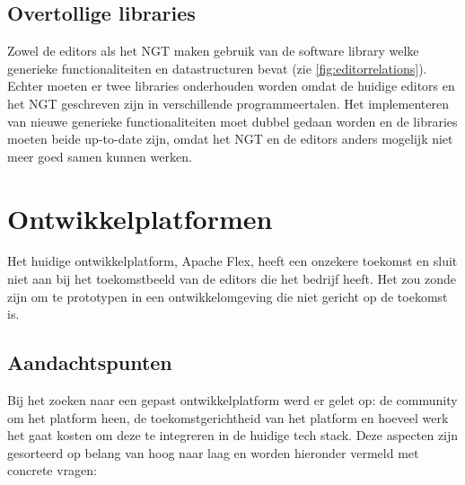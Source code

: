 \subsection{Overtollige libraries}
Zowel de editors als het NGT maken gebruik van de \organisation{} software library welke generieke functionaliteiten en datastructuren bevat (zie \autoref{fig:editorrelations}). Echter moeten er twee libraries onderhouden worden omdat de huidige editors en het NGT geschreven zijn in verschillende programmeertalen. Het implementeren van nieuwe generieke functionaliteiten moet dubbel gedaan worden en de libraries moeten beide up-to-date zijn, omdat het NGT en de editors anders mogelijk niet meer goed samen kunnen werken.

\section{Ontwikkelplatformen}
Het huidige ontwikkelplatform, Apache Flex, heeft een onzekere toekomst en sluit niet aan bij het toekomstbeeld van de editors die het bedrijf heeft. Het zou zonde zijn om te prototypen in een ontwikkelomgeving die niet gericht op de toekomst is.

\subsection{Aandachtspunten}
Bij het zoeken naar een gepast ontwikkelplatform werd er gelet op: de community om het platform heen, de toekomstgerichtheid van het platform en hoeveel werk het gaat kosten om deze te integreren in de huidige tech stack. Deze aspecten zijn gesorteerd op belang van hoog naar laag en worden hieronder vermeld met concrete vragen:

